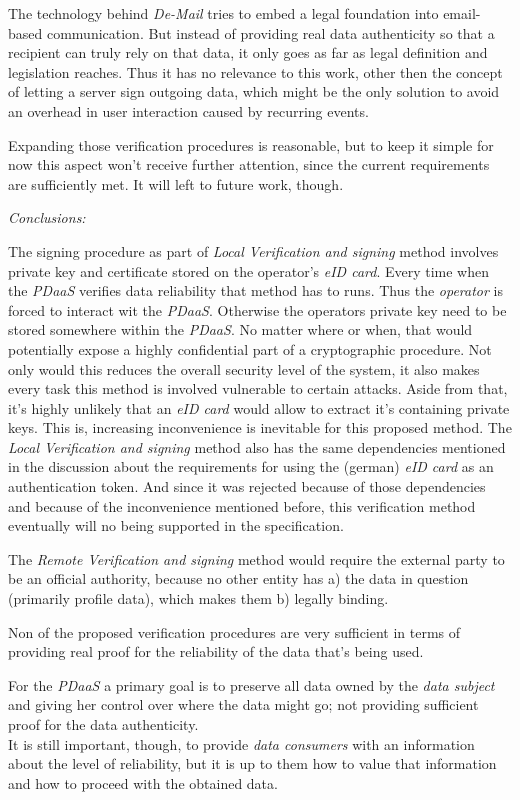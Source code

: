 \documentclass[12pt,english,a4paper,titlepage,cleardoublepage=empty,dottedtoc]{report}
\begin{document}
The technology behind \emph{De-Mail} tries to embed a legal foundation
into email-based communication. But instead of providing real data
authenticity so that a recipient can truly rely on that data, it only
goes as far as legal definition and legislation reaches. Thus it has no
relevance to this work, other then the concept of letting a server sign
outgoing data, which might be the only solution to avoid an overhead in
user interaction caused by recurring events.

Expanding those verification procedures is reasonable, but to keep it
simple for now this aspect won't receive further attention, since the
current requirements are sufficiently met. It will left to future work,
though.

\emph{Conclusions:}

The signing procedure as part of \emph{Local Verification and signing}
method involves private key and certificate stored on the operator's
\emph{eID card}. Every time when the \emph{PDaaS} verifies data
reliability that method has to runs. Thus the \emph{operator} is forced
to interact wit the \emph{PDaaS}. Otherwise the operators private key
need to be stored somewhere within the \emph{PDaaS}. No matter where or
when, that would potentially expose a highly confidential part of a
cryptographic procedure. Not only would this reduces the overall
security level of the system, it also makes every task this method is
involved vulnerable to certain attacks. Aside from that, it's highly
unlikely that an \emph{eID card} would allow to extract it's containing
private keys. This is, increasing inconvenience is inevitable for this
proposed method. The \emph{Local Verification and signing} method also
has the same dependencies mentioned in the discussion about the
requirements for using the (german) \emph{eID card} as an authentication
token. And since it was rejected because of those dependencies and
because of the inconvenience mentioned before, this verification method
eventually will no being supported in the specification.

The \emph{Remote Verification and signing} method would require the
external party to be an official authority, because no other entity has
a) the data in question (primarily profile data), which makes them b)
legally binding.

Non of the proposed verification procedures are very sufficient in terms
of providing real proof for the reliability of the data that's being
used.

For the \emph{PDaaS} a primary goal is to preserve all data owned by the
\emph{data subject} and giving her control over where the data might go;
not providing sufficient proof for the data authenticity.\\
It is still important, though, to provide \emph{data consumers} with an
information about the level of reliability, but it is up to them how to
value that information and how to proceed with the obtained data.
\end{document}
